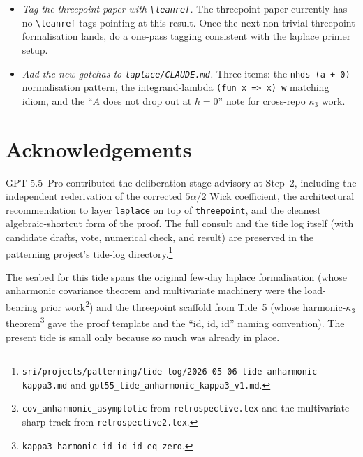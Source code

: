 \documentclass[11pt]{article}
\begin{document}
\begin{itemize}
\item \emph{Tag the threepoint paper with \texttt{\textbackslash leanref}.}
The threepoint paper currently has no \texttt{\textbackslash leanref}
tags pointing at this result. Once the next non-trivial threepoint
formalisation lands, do a one-pass tagging consistent with the laplace
primer setup.

\item \emph{Add the new gotchas to \texttt{laplace/CLAUDE.md}.} Three
items: the \texttt{nhds (a + 0)} normalisation pattern, the
integrand-lambda \texttt{(fun x => x) w} matching idiom, and the
``$A$ does not drop out at $h = 0$'' note for cross-repo $\kappa_3$ work.
\end{itemize}

\section*{Acknowledgements}

GPT-5.5~Pro contributed the deliberation-stage advisory at Step~2,
including the independent rederivation of the corrected $5\alpha/2$
Wick coefficient, the architectural recommendation to layer
\texttt{laplace} on top of \texttt{threepoint}, and the cleanest
algebraic-shortcut form of the proof. The full consult and the tide log
itself (with candidate drafts, vote, numerical check, and
result) are preserved in the patterning project's tide-log
directory.\footnote{\texttt{sri/projects/patterning/tide-log/}\allowbreak\texttt{2026-05-06-tide-anharmonic-kappa3.md}
and \texttt{gpt55\_tide\_anharmonic\_kappa3\_v1.md}.}

The seabed for this tide spans the original few-day laplace
formalisation (whose anharmonic covariance theorem and multivariate
machinery were the load-bearing prior
work\footnote{\texttt{cov\_anharmonic\_asymptotic} from
\texttt{retrospective.tex} and the multivariate sharp track from
\texttt{retrospective2.tex}.}) and the threepoint scaffold from Tide~5
(whose harmonic-$\kappa_3$
theorem\footnote{\texttt{kappa3\_harmonic\_id\_id\_id\_eq\_zero}.} gave
the proof template and the ``id, id, id'' naming convention). The
present tide is small only because so much was already in place.
\end{document}

